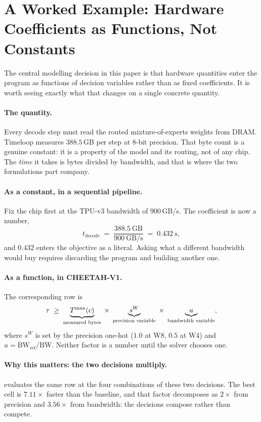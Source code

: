 \section{A Worked Example: Hardware Coefficients as Functions, Not Constants}
\label{app:worked_example}

The central modelling decision in this paper is that hardware quantities enter
the program as functions of decision variables rather than as fixed
coefficients. It is worth seeing exactly what that changes on a single concrete
quantity.

\paragraph{The quantity.}
Every decode step must read the routed mixture-of-experts weights from DRAM.
Timeloop measures $388.5$\,GB per step at $8$-bit precision. That byte count is a
genuine constant: it is a property of the model and its routing, not of any chip.
The \emph{time} it takes is bytes divided by bandwidth, and that is where the two
formulations part company.

\paragraph{As a constant, in a sequential pipeline.}
Fix the chip first at the TPU-v3 bandwidth of $900$\,GB/s. The coefficient is now
a number,
\[
t_{\mathrm{decode}} \;=\; \frac{388.5\ \mathrm{GB}}{900\ \mathrm{GB/s}}
\;=\; 0.432\ \mathrm{s},
\]
and $0.432$ enters the objective as a literal. Asking what a different bandwidth
would buy requires discarding the program and building another one.

\paragraph{As a function, in CHEETAH-V1.}
The corresponding row is
\[
\tau \;\ge\; \underbrace{T^{\max}(c)}_{\text{measured bytes}}
\;\times\; \underbrace{s^W}_{\text{precision variable}}
\;\times\; \underbrace{u}_{\text{bandwidth variable}},
\]
where $s^W$ is set by the precision one-hot ($1.0$ at W8, $0.5$ at W4) and
$u = \mathrm{BW_{ref}}/\mathrm{BW}$. Neither factor is a number until the solver
chooses one.

\paragraph{Why this matters: the two decisions multiply.}
 evaluates the same row at the four combinations of
these two decisions. The best cell is $7.11\times$ faster than the baseline, and
that factor decomposes as $2\times$ from precision and $3.56\times$ from
bandwidth: the decisions compose rather than compete.

